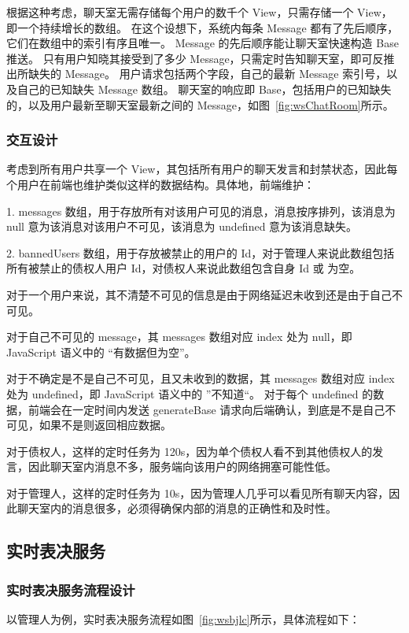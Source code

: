 根据这种考虑，聊天室无需存储每个用户的数千个 View，只需存储一个 View，即一个持续增长的数组。
在这个设想下，系统内每条 Message 都有了先后顺序，它们在数组中的索引有序且唯一。
Message 的先后顺序能让聊天室快速构造 Base 推送。
只有用户知晓其接受到了多少 Message，只需定时告知聊天室，即可反推出所缺失的 Message。
用户请求包括两个字段，自己的最新 Message 索引号，以及自己的已知缺失 Message 数组。
聊天室的响应即 Base，包括用户的已知缺失的，以及用户最新至聊天室最新之间的 Message，如图~\ref{fig:wsChatRoom}所示。


  \subsubsection{交互设计}
  考虑到所有用户共享一个 View，其包括所有用户的聊天发言和封禁状态，因此每个用户在前端也维护类似这样的数据结构。具体地，前端维护：

  1. messages 数组，用于存放所有对该用户可见的消息，消息按序排列，该消息为 null 意为该消息对该用户不可见，该消息为 undefined 意为该消息缺失。

  2. bannedUsers 数组，用于存放被禁止的用户的 Id，对于管理人来说此数组包括所有被禁止的债权人用户 Id，对债权人来说此数组包含自身 Id 或 为空。

对于一个用户来说，其不清楚不可见的信息是由于网络延迟未收到还是由于自己不可见。

对于自己不可见的 message，其 messages 数组对应 index 处为 null，即 JavaScript 语义中的 “有数据但为空”。

对于不确定是不是自己不可见，且又未收到的数据，其 messages 数组对应 index 处为 undefined，即 JavaScript 语义中的 ”不知道“。
对于每个 undefined 的数据，前端会在一定时间内发送 generateBase 请求向后端确认，到底是不是自己不可见，如果不是则返回相应数据。

对于债权人，这样的定时任务为 120s，因为单个债权人看不到其他债权人的发言，因此聊天室内消息不多，服务端向该用户的网络拥塞可能性低。

对于管理人，这样的定时任务为 10s，因为管理人几乎可以看见所有聊天内容，因此聊天室内的消息很多，必须得确保内部的消息的正确性和及时性。

\subsection{实时表决服务}

\subsubsection{实时表决服务流程设计}
以管理人为例，实时表决服务流程如图~\ref{fig:wsbjlc}所示，具体流程如下：

